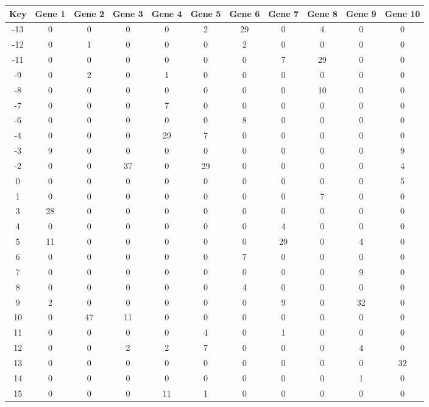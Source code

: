 \begin{tabular}{|c|c|c|c|c|c|c|c|c|c|c|}
\hline
Key & Gene 1 & Gene 2 & Gene 3 & Gene 4 & Gene 5 & Gene 6 & Gene 7 & Gene 8 & Gene 9 & Gene 10 \\
\hline
-13 & 0 & 0 & 0 & 0 & 2 & 29 & 0 & 4 & 0 & 0 \\
-12 & 0 & 1 & 0 & 0 & 0 & 2 & 0 & 0 & 0 & 0 \\
-11 & 0 & 0 & 0 & 0 & 0 & 0 & 7 & 29 & 0 & 0 \\
-9 & 0 & 2 & 0 & 1 & 0 & 0 & 0 & 0 & 0 & 0 \\
-8 & 0 & 0 & 0 & 0 & 0 & 0 & 0 & 10 & 0 & 0 \\
-7 & 0 & 0 & 0 & 7 & 0 & 0 & 0 & 0 & 0 & 0 \\
-6 & 0 & 0 & 0 & 0 & 0 & 8 & 0 & 0 & 0 & 0 \\
-4 & 0 & 0 & 0 & 29 & 7 & 0 & 0 & 0 & 0 & 0 \\
-3 & 9 & 0 & 0 & 0 & 0 & 0 & 0 & 0 & 0 & 9 \\
-2 & 0 & 0 & 37 & 0 & 29 & 0 & 0 & 0 & 0 & 4 \\
0 & 0 & 0 & 0 & 0 & 0 & 0 & 0 & 0 & 0 & 5 \\
1 & 0 & 0 & 0 & 0 & 0 & 0 & 0 & 7 & 0 & 0 \\
3 & 28 & 0 & 0 & 0 & 0 & 0 & 0 & 0 & 0 & 0 \\
4 & 0 & 0 & 0 & 0 & 0 & 0 & 4 & 0 & 0 & 0 \\
5 & 11 & 0 & 0 & 0 & 0 & 0 & 29 & 0 & 4 & 0 \\
6 & 0 & 0 & 0 & 0 & 0 & 7 & 0 & 0 & 0 & 0 \\
7 & 0 & 0 & 0 & 0 & 0 & 0 & 0 & 0 & 9 & 0 \\
8 & 0 & 0 & 0 & 0 & 0 & 4 & 0 & 0 & 0 & 0 \\
9 & 2 & 0 & 0 & 0 & 0 & 0 & 9 & 0 & 32 & 0 \\
10 & 0 & 47 & 11 & 0 & 0 & 0 & 0 & 0 & 0 & 0 \\
11 & 0 & 0 & 0 & 0 & 4 & 0 & 1 & 0 & 0 & 0 \\
12 & 0 & 0 & 2 & 2 & 7 & 0 & 0 & 0 & 4 & 0 \\
13 & 0 & 0 & 0 & 0 & 0 & 0 & 0 & 0 & 0 & 32 \\
14 & 0 & 0 & 0 & 0 & 0 & 0 & 0 & 0 & 1 & 0 \\
15 & 0 & 0 & 0 & 11 & 1 & 0 & 0 & 0 & 0 & 0 \\
\hline
\end{tabular}